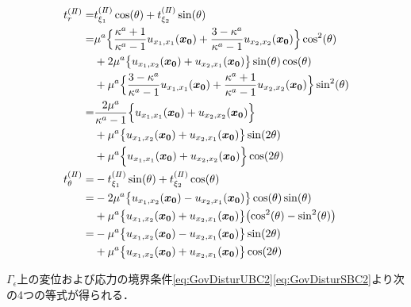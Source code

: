 \begin{align}
	t_{r}^{(I\hspace{-.15em}I)}
		=&t_{\xi_1}^{(I\hspace{-.15em}I)}\cos(\theta)+t_{\xi_2}^{(I\hspace{-.15em}I)}\sin(\theta)
			\nonumber
			\\
		=&\mu^a\Bigl\{\frac{\kappa^a+1}{\kappa^a-1} u_{x_{1},x_{1}}(\bm{x_{0}})
			+\frac{3-\kappa^a}{\kappa^a-1} u_{x_{2},x_{2}}(\bm{x_{0}})\Bigr\}\cos^2(\theta)
			\nonumber
			\\
			&+2\mu^a\bigl\{u_{x_{1},x_{2}}(\bm{x_{0}})
			+u_{x_{2},x_{1}}(\bm{x_{0}})\bigr\}\sin(\theta)\cos(\theta)
			\nonumber
			\\
			&+\mu^a\Bigl\{ \frac{3-\kappa^a}{\kappa^a-1} u_{x_{1},x_{1}}(\bm{x_{0}})
			+\frac{\kappa^a+1}{\kappa^a-1} u_{x_{2},x_{2}}(\bm{x_{0}})\Bigr\}\sin^2(\theta)
			\nonumber
			\\
		=&\frac{2\mu^a}{\kappa^a-1}\Bigl\{ u_{x_{1},x_{1}}(\bm{x_{0}})
			+ u_{x_{2},x_{2}}(\bm{x_{0}})\Bigr\}
			\nonumber
			\\
			&+\mu^a\bigl\{u_{x_{1},x_{2}}(\bm{x_{0}})
			+u_{x_{2},x_{1}}(\bm{x_{0}})\bigr\}\sin(2\theta)
			\nonumber
			\\
			&+\mu^a\Bigl\{ u_{x_{1},x_{1}}(\bm{x_{0}})
			+ u_{x_{2},x_{2}}(\bm{x_{0}})\Bigr\}\cos(2\theta)
			\\
	t_{\theta}^{(I\hspace{-.15em}I)}				
		=&-t_{\xi_1}^{(I\hspace{-.15em}I)}\sin(\theta)+t_{\xi_2}^{(I\hspace{-.15em}I)}\cos(\theta)
			\nonumber
			\\
		=&-2\mu^a \bigl\{u_{x_{1},x_{2}}(\bm{x_{0}})-u_{x_{2},x_{1}}(\bm{x_{0}})\bigr\}\cos(\theta)\sin(\theta)
			\nonumber
			\\
			&+\mu^a \bigl\{u_{x_{1},x_{2}}(\bm{x_{0}})+u_{x_{2},x_{1}}(\bm{x_{0}})\bigr\}
			\bigl(\cos^2(\theta)-\sin^2(\theta)\bigr)
			\nonumber
			\\
		=&-\mu^a \bigl\{u_{x_{1},x_{2}}(\bm{x_{0}})-u_{x_{2},x_{1}}(\bm{x_{0}})\bigr\}\sin(2\theta)
			\nonumber
			\\
			&+\mu^a \bigl\{u_{x_{1},x_{2}}(\bm{x_{0}})+u_{x_{2},x_{1}}(\bm{x_{0}})\bigr\}\cos(2\theta)
\end{align}

$\Gamma_{\epsilon}$上の変位および応力の境界条件\eqref{eq:GovDisturUBC2}\eqref{eq:GovDisturSBC2}より次の4つの等式が得られる．


